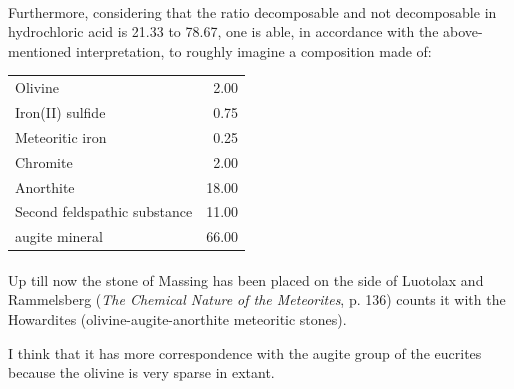 \documentclass[a4paper, 12pt, oneside]{article}
\begin{document}
\paragraph*{}
Furthermore, considering that the ratio decomposable and not decomposable in hydrochloric acid is 21.33 to 78.67, one is able, in accordance with the above-mentioned interpretation, to roughly imagine a composition made of: 
\begin{center}
    \begin{tabular}{l r}
        Olivine & 2.00\\
        Iron(II) sulfide & 0.75\\
        Meteoritic iron & 0.25\\
        Chromite & 2.00\\
        Anorthite & 18.00\\
        Second feldspathic substance & 11.00\\
        augite\index{augite} mineral & 66.00\\
    \end{tabular}
\end{center}
\paragraph*{}
Up till now the stone of Massing has been placed on the side of Luotolax and Rammelsberg (\emph{The Chemical Nature of the Meteorites}, p. 136) counts it with the Howardites (olivine-augite-anorthite meteoritic stones).

I think that it has more correspondence with the augite group of the eucrites because the olivine is very sparse in extant.
\end{document}
